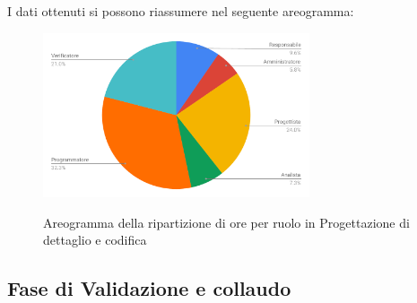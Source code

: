 I dati ottenuti si possono riassumere nel seguente areogramma:
\begin{figure}[H] 
			\centering 
				\includegraphics[width=0.7\textwidth]{res/images/areogramma_dettaglio.pdf}\\
				\caption{Areogramma della ripartizione di ore per ruolo in Progettazione di dettaglio e codifica}
			\label{AreogrammaDettaglio}
\end{figure}


\subsection{Fase di Validazione e collaudo}
